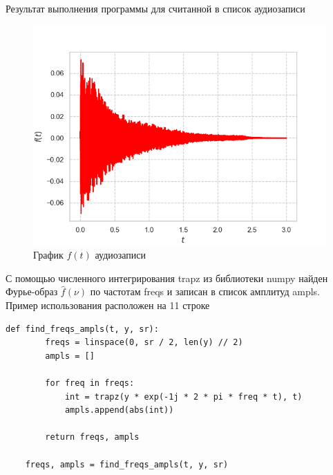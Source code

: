 \documentclass[a4paper, 16pt]{article}
\begin{document}
    \noindent Результат выполнения программы для считанной в список аудиозаписи
    \begin{figure}[!htb]
        \centering
        \includegraphics[scale=0.65]{f_t.png}
        \captionsetup{skip=0pt}
        \caption{График $f(t)$ аудиозаписи}
        \label{Рис:15}
    \end{figure}


    \noindent С помощью численного интегрирования trapz из библиотеки numpy найден Фурье-образ $\hat{f}(\nu)$
    по частотам freqs и записан в список амплитуд ampls. Пример использования расположен на 11 строке
    \begin{lstlisting}[label=fimgmp3, caption=Программа для нахождения Фурье-образа аудиозаписи]
    def find_freqs_ampls(t, y, sr):
        freqs = linspace(0, sr / 2, len(y) // 2)
        ampls = []
    
        for freq in freqs:
            int = trapz(y * exp(-1j * 2 * pi * freq * t), t)
            ampls.append(abs(int))
    
        return freqs, ampls

    freqs, ampls = find_freqs_ampls(t, y, sr)
    \end{lstlisting}
\end{document}
